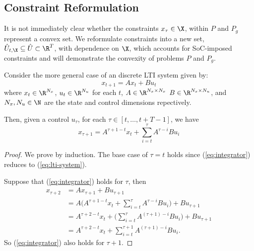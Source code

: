 \documentclass{homework}
\begin{document}
\subsection{Constraint Reformulation}

It is not immediately clear whether the constraints $x_\tau\in\X$, within $P$ and $P_g$ represent
a convex set. We reformulate constraints into a new set, $\hat{U}_{t,\X}\subseteq \hat{U} \subset \R^T$,
with dependence on $\X$, which accounts for SoC-imposed constraints and
will demonstrate the convexity of problems $P$ and $P_g$.

Consider the more general case of an discrete LTI system given by:
\begin{equation}
    x_{t + 1} = A x_t + B u_t
    \label{eq:lti-system}
\end{equation}
where $x_t\in \R^{N_x}$, $u_t\in\R^{N_u}$ for each $t$, $A\in\R^{N_x \times N_x}$
$B \in \R^{N_x \times N_u}$, and $N_x,N_u\in\N$ are the state and control dimensions
repectively.

Then, given a control $u_\tau$, for each $\tau \in [t, \dots, t + T - 1]$, we have
\begin{equation}
    x_{\tau + 1} = A^{\tau + 1 - t} x_t + \sum_{i=t}^{\tau} A^{\tau - i} B u_i
    \label{eq:integrator}
\end{equation}

\begin{proof}
    We prove by induction. The base case of $\tau = t$ holds since
    (\ref{eq:integrator}) reduces to (\ref{eq:lti-system}).

    Suppose that (\ref{eq:integrator}) holds for $\tau$, then
    \begin{align*}
        x_{\tau + 2} &= A x_{\tau + 1} + Bu_{\tau + 1} \\
            &= A \biggl(
            A^{\tau + 1 - t} x_t + \sum_{i=t}^\tau A^{\tau - i} B u_i
        \biggr) + B u_{\tau + 1} \\
        &= A^{\tau + 2 - t} x_t + \biggl(\sum_{i=t}^\tau A^{(\tau + 1) - i} B u_i\biggr) + B u_{\tau + 1}\\
        &= A^{\tau + 2 - t} x_t + \sum_{i=t}^{\tau + 1} A^{(\tau + 1) - i} B u_i.
    \end{align*}
    So (\ref{eq:integrator}) also holds for $\tau + 1$.
\end{proof}
\end{document}
